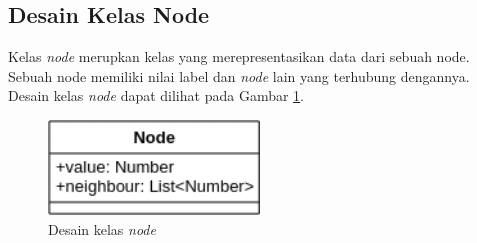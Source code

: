 \subsection{Desain Kelas Node}\label{desain_kelas_node}
Kelas \textit{node} merupkan kelas yang merepresentasikan data dari sebuah node. Sebuah node memiliki nilai label dan \textit{node} lain yang terhubung dengannya. Desain kelas \textit{node} dapat dilihat pada Gambar \ref{fig:class_node}.

\begin{figure}[ht]
	\centering\includegraphics[width=0.5\textwidth]{bab3/figures/class_node.png}
	\caption{Desain kelas \textit{node}}
	\label{fig:class_node}
\end{figure}